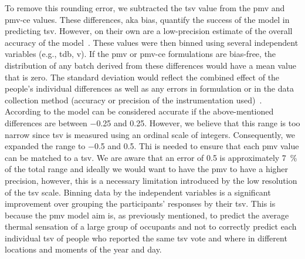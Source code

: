 To remove this rounding error, we subtracted the \ac{tsv} value from the \ac{pmv} and \ac{pmv-ce} values.
These differences, aka bias, quantify the success of the model in predicting \ac{tsv}.
However, on their own are a low-precision estimate of the overall accuracy of the model~\cite{Humphreys2002}.
These values were then binned using several independent variables (e.g., \ac{tdb}, \ac{v}).
If the \ac{pmv} or \ac{pmv-ce} formulations are bias-free, the distribution of any batch derived from these differences would have a mean value that is zero.
The standard deviation would reflect the combined effect of the people's individual differences as well as any errors in formulation or in the data collection method (accuracy or precision of the instrumentation used)~\cite{Humphreys2002}.
According to  the model can be considered accurate if the above-mentioned differences are between \num{-0.25} and \num{0.25}.
However, we believe that this range is too narrow since \ac{tsv} is measured using an ordinal scale of integers.
Consequently, we expanded the range to \num{-.5} and \num{0.5}.
Thi is needed to ensure that each \ac{pmv} value can be matched to a \ac{tsv}.
We are aware that an error of \num{.5} is approximately \qty{7}{\percent} of the total range and ideally we would want to have the \ac{pmv} to have a higher precision, however, this is a necessary limitation introduced by the low resolution of the \ac{tsv} scale.
Binning data by the independent variables is a significant improvement over grouping the participants' responses by their \ac{tsv}.
This is because the \ac{pmv} model aim is, as previously mentioned, to predict the average thermal sensation of a large group of occupants and not to correctly predict each individual \ac{tsv} of people who reported the same \ac{tsv} vote and where in different locations and moments of the year and day.

